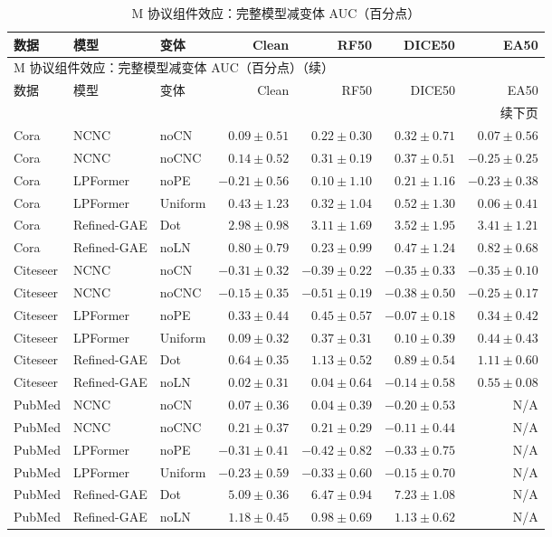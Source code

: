 {\footnotesize
\setlength{\tabcolsep}{3.2pt}
\renewcommand{\arraystretch}{1.10}
\begin{longtable}{lllrrrr}
\caption{M 协议组件效应：完整模型减变体 AUC（百分点）}\\
\toprule
数据 & 模型 & 变体 & Clean & RF50 & DICE50 & EA50 \\
\midrule
\endfirsthead
\multicolumn{7}{l}{M 协议组件效应：完整模型减变体 AUC（百分点）（续）}\\
\toprule
数据 & 模型 & 变体 & Clean & RF50 & DICE50 & EA50 \\
\midrule
\endhead
\midrule\multicolumn{7}{r}{续下页}\\
\endfoot
\bottomrule
\endlastfoot
Cora & NCNC & noCN & $0.09\pm0.51$ & $0.22\pm0.30$ & $0.32\pm0.71$ & $0.07\pm0.56$ \\
Cora & NCNC & noCNC & $0.14\pm0.52$ & $0.31\pm0.19$ & $0.37\pm0.51$ & $-0.25\pm0.25$ \\
Cora & LPFormer & noPE & $-0.21\pm0.56$ & $0.10\pm1.10$ & $0.21\pm1.16$ & $-0.23\pm0.38$ \\
Cora & LPFormer & Uniform & $0.43\pm1.23$ & $0.32\pm1.04$ & $0.52\pm1.30$ & $0.06\pm0.41$ \\
Cora & Refined-GAE & Dot & $2.98\pm0.98$ & $3.11\pm1.69$ & $3.52\pm1.95$ & $3.41\pm1.21$ \\
Cora & Refined-GAE & noLN & $0.80\pm0.79$ & $0.23\pm0.99$ & $0.47\pm1.24$ & $0.82\pm0.68$ \\
Citeseer & NCNC & noCN & $-0.31\pm0.32$ & $-0.39\pm0.22$ & $-0.35\pm0.33$ & $-0.35\pm0.10$ \\
Citeseer & NCNC & noCNC & $-0.15\pm0.35$ & $-0.51\pm0.19$ & $-0.38\pm0.50$ & $-0.25\pm0.17$ \\
Citeseer & LPFormer & noPE & $0.33\pm0.44$ & $0.45\pm0.57$ & $-0.07\pm0.18$ & $0.34\pm0.42$ \\
Citeseer & LPFormer & Uniform & $0.09\pm0.32$ & $0.37\pm0.31$ & $0.10\pm0.39$ & $0.44\pm0.43$ \\
Citeseer & Refined-GAE & Dot & $0.64\pm0.35$ & $1.13\pm0.52$ & $0.89\pm0.54$ & $1.11\pm0.60$ \\
Citeseer & Refined-GAE & noLN & $0.02\pm0.31$ & $0.04\pm0.64$ & $-0.14\pm0.58$ & $0.55\pm0.08$ \\
PubMed & NCNC & noCN & $0.07\pm0.36$ & $0.04\pm0.39$ & $-0.20\pm0.53$ & N/A \\
PubMed & NCNC & noCNC & $0.21\pm0.37$ & $0.21\pm0.29$ & $-0.11\pm0.44$ & N/A \\
PubMed & LPFormer & noPE & $-0.31\pm0.41$ & $-0.42\pm0.82$ & $-0.33\pm0.75$ & N/A \\
PubMed & LPFormer & Uniform & $-0.23\pm0.59$ & $-0.33\pm0.60$ & $-0.15\pm0.70$ & N/A \\
PubMed & Refined-GAE & Dot & $5.09\pm0.36$ & $6.47\pm0.94$ & $7.23\pm1.08$ & N/A \\
PubMed & Refined-GAE & noLN & $1.18\pm0.45$ & $0.98\pm0.69$ & $1.13\pm0.62$ & N/A \\
\end{longtable}
}
